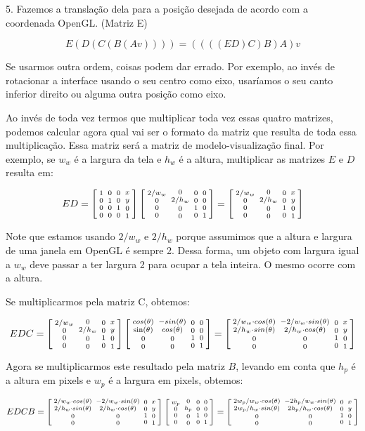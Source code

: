 5. Fazemos a translação dela para a posição desejada de acordo com a
coordenada OpenGL. (Matriz E)

$$
E(D(C(B(A v)))) = ((((ED)C)B)A)v
$$

Se usarmos outra ordem, coisas podem dar errado. Por exemplo, ao invés
de rotacionar a interface usando o seu centro como eixo, usaríamos o
seu canto inferior direito ou alguma outra posição como eixo.

Ao invés de toda vez termos que multiplicar toda vez essas quatro
matrizes, podemos calcular agora qual vai ser o formato da matriz que
resulta de toda essa multiplicação. Essa matriz será a matriz de
modelo-visualização final. Por exemplo, se $w_w$ é a largura da tela e
$h_w$ é a altura, multiplicar as matrizes $E$ e $D$ resulta em:

$$ ED=\left[{{1 \atop 0}\atop {0\atop 0}}{{0 \atop 1}\atop {0 \atop
      0}}{{0\atop 0}\atop{1 \atop 0}}{{x \atop y}\atop{0\atop
      1}}\right]\left[{{2/w_w \atop 0}\atop {0\atop 0}}{{0 \atop
      2/h_w}\atop {0 \atop 0}}{{0\atop 0}\atop{1 \atop 0}}{{0 \atop
      0}\atop{0\atop 1}}\right]=
\left[{{2/w_w \atop 0}\atop {0\atop 0}}
  {{0 \atop 2/h_w}\atop {0 \atop 0}}
  {{0\atop 0}\atop{1 \atop 0}}
  {{x \atop y}\atop{0\atop 1}}\right]
$$

Note que estamos usando $2/w_w$ e $2/h_w$ porque assumimos que a
altura e largura de uma janela em OpenGL é sempre 2. Dessa forma, um
objeto com largura igual a $w_w$ deve passar a ter largura 2 para
ocupar a tela inteira. O mesmo ocorre com a altura.

Se multiplicarmos pela matriz C, obtemos:

$$
EDC = \left[{{2/w_w \atop 0}\atop {0\atop 0}} {{0 \atop 2/h_w}\atop
  {0 \atop 0}} {{0\atop 0}\atop{1 \atop 0}} {{x \atop y}\atop{0\atop
  1}}\right]\left[{{cos(\theta) \atop \sin(\theta)}\atop {0\atop
  0}}{{-sin(\theta) \atop cos(\theta)}\atop {0 \atop 0}}{{0\atop
  0}\atop{1 \atop 0}}{{0 \atop 0}\atop{0\atop 1}}\right] =
\left[{{2/w_w\cdot cos(\theta) \atop 2/h_w\cdot sin(\theta)}
\atop {0\atop 0}}
  {{-2/w_w\cdot sin(\theta) \atop 2/h_w\cdot cos(\theta)}\atop
  {0 \atop 0}} {{0\atop 0}\atop{1 \atop 0}} {{x \atop y}\atop{0\atop
  1}}\right]
$$

Agora se multiplicarmos este resultado pela matriz $B$, levando em
conta que $h_p$ é a altura em pixels e $w_p$ é a largura em pixels,
obtemos:

$$ EDCB =
\left[{{2/w_w\cdot cos(\theta) \atop 2/h_w\cdot sin(\theta)}
\atop {0\atop 0}}
  {{-2/w_w\cdot sin(\theta) \atop 2/h_w\cdot cos(\theta)}\atop
  {0 \atop 0}} {{0\atop 0}\atop{1 \atop 0}} {{x \atop y}\atop{0\atop
  1}}\right]\left[{{w_p \atop 0}\atop {0\atop 0}}{{0 \atop h_p}\atop
  {0 \atop 0}}{{0\atop 0}\atop{1 \atop 0}}{{0 \atop 0}\atop{0\atop
  1}}\right]=
\left[{{2w_p/w_w\cdot cos(\theta) \atop 2w_p/h_w\cdot sin(\theta)}
\atop {0\atop 0}}
  {{-2h_p/w_w\cdot sin(\theta) \atop 2h_p/h_w\cdot cos(\theta)}\atop
  {0 \atop 0}} {{0\atop 0}\atop{1 \atop 0}} {{x \atop y}\atop{0\atop
  1}}\right]
$$

